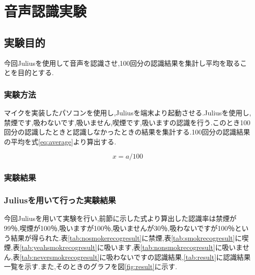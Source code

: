 \documentclass[12pt,oneside]{sotsuken_paper}
\begin{document}
\chapter{音声認識実験}
\section{実験目的}
今回Juliusを使用して音声を認識させ,100回分の認識結果を集計し平均を取ることを目的とする.


\subsection{実験方法}
マイクを実装したパソコンを使用し,Juliusを端末より起動させる.Juliusを使用し,禁煙です,吸わないです,吸いません,喫煙です,吸いますの認識を行う.このとき100回分の認識したときと認識しなかったときの結果を集計する.100回分の認識結果の平均を式\ref{eq:average}より算出する.

\setcounter{equation}{0}
\begin{equation}
  x = a / 100
\end{equation}
\label{eq:average}


\subsection{実験結果}
\subsection{Juliusを用いて行った実験結果}
今回Juliusを用いて実験を行い,前節に示した式より算出した認識率は禁煙が99％,喫煙が100％,吸いますが100％,吸いませんが30％,吸わないですが100％という結果が得られた.表\ref{tab:nosmokerecogresult}に禁煙,表\ref{tab:smokrecogresult}に喫煙,表\ref{tab:yeahsmokrecogresult}に吸います,表\ref{tab:nonsmokrecogresult}に吸いません,表\ref{tab:neversmokrecogresult}に吸わないですの認識結果,\ref{tab:result}に認識結果一覧を示す.また,そのときのグラフを図\ref{fig:result}に示す.
\end{document}
